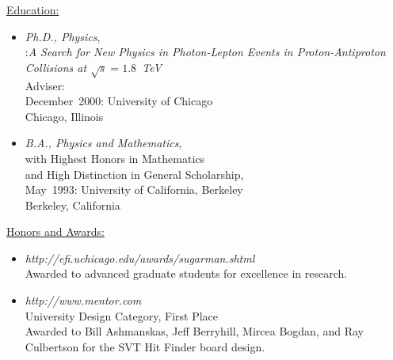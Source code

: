 \documentclass [12pt]{report}
\begin{document}
\clearpage
\newpage

\noindent\underline{Education:}

\begin{itemize}
\item{{\em Ph.D., Physics},\\
:{\em A Search for New Physics in Photon-Lepton
Events in Proton-Antiproton Collisions at $\sqrt{s} = 1.8$~TeV}\\ 
Adviser: \\
December~2000: University of Chicago\\
Chicago, Illinois}

\item{{\em B.A., Physics and Mathematics},\\
with Highest Honors in Mathematics\\
and High Distinction in General Scholarship,\\ 
May~1993: University of California, Berkeley\\
Berkeley, California}

\end{itemize}

\noindent\underline{Honors and Awards:}
\begin{itemize}
\item{{\em {}
{http://efi.uchicago.edu/awards/sugarman.shtml}} \\
Awarded to advanced graduate students for excellence in research.}
\item{{\em {}
{http://www.mentor.com}} \\
University Design Category, First Place\\
Awarded to Bill Ashmanskas, Jeff Berryhill, Mircea Bogdan, and 
Ray Culbertson for the SVT Hit Finder board design.\\}
\end{itemize}


\end{document}
